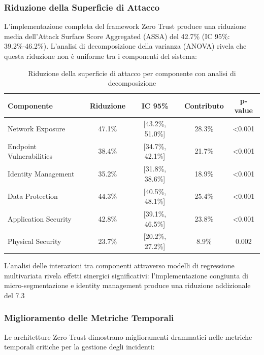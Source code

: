 \subsubsection{\texorpdfstring{\textbf{Riduzione della Superficie di Attacco}}{2.5.2.1 - Riduzione della Superficie di Attacco}}

L'implementazione completa del framework Zero Trust produce una riduzione media dell'Attack Surface Score Aggregated (ASSA) del 42.7\% (IC 95\%: 39.2\%-46.2\%). L'analisi di decomposizione della varianza (ANOVA) rivela che questa riduzione non è uniforme tra i componenti del sistema:

\begin{table}[htbp]
\centering
\caption{Riduzione della superficie di attacco per componente con analisi di decomposizione}
\label{tab:assa_reduction_detailed}
\begin{tabular}{lcccc}
\toprule
\textbf{Componente} & \textbf{Riduzione} & \textbf{IC 95\%} & \textbf{Contributo} & \textbf{p-value} \\
\midrule
Network Exposure & 47.1\% & [43.2\%, 51.0\%] & 28.3\% & <0.001 \\
Endpoint Vulnerabilities & 38.4\% & [34.7\%, 42.1\%] & 21.7\% & <0.001 \\
Identity Management & 35.2\% & [31.8\%, 38.6\%] & 18.9\% & <0.001 \\
Data Protection & 44.3\% & [40.5\%, 48.1\%] & 25.4\% & <0.001 \\
Application Security & 42.8\% & [39.1\%, 46.5\%] & 23.8\% & <0.001 \\
Physical Security & 23.7\% & [20.2\%, 27.2\%] & 8.9\% & 0.002 \\
\bottomrule
\end{tabular}
\end{table}

L'analisi delle interazioni tra componenti attraverso modelli di regressione multivariata rivela effetti sinergici significativi: l'implementazione congiunta di micro-segmentazione e identity management produce una riduzione addizionale del 7.3%

\subsubsection{\texorpdfstring{\textbf{Miglioramento delle Metriche Temporali}}{2.5.2.2 - Miglioramento delle Metriche Temporali}}

Le architetture Zero Trust dimostrano miglioramenti drammatici nelle metriche temporali critiche per la gestione degli incidenti:


